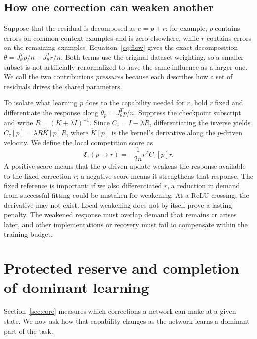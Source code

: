 \documentclass[11pt,a4paper]{article}
\begin{document}
\subsection{How one correction can weaken another}

Suppose that the residual is decomposed as $e=p+r$: for example, $p$ contains errors on common-context examples and is zero elsewhere, while $r$ contains errors on the remaining examples. Equation~\eqref{eq:flow} gives the exact decomposition $\dot\theta=J_\theta^Tp/n+J_\theta^Tr/n$. Both terms use the original dataset weighting, so a smaller subset is not artificially renormalized to have the same influence as a larger one. We call the two contributions \emph{pressures} because each describes how a set of residuals drives the shared parameters.

To isolate what learning $p$ does to the capability needed for $r$, hold $r$ fixed and differentiate the response along $\dot\theta_p=J_\theta^Tp/n$. Suppress the checkpoint subscript and write $R=(K+\lambda I)^{-1}$. Since $C_\tau=I-\lambda R$, differentiating the inverse yields $\dot C_\tau[p]=\lambda R\dot K[p]R$, where $\dot K[p]$ is the kernel's derivative along the $p$-driven velocity. We define the local competition score as
\begin{equation}
 \mathfrak C_\tau(p\!\to\!r)=-\frac{1}{2n}r^T\dot C_\tau[p]r.
 \label{eq:competition}
\end{equation}
A positive score means that the $p$-driven update weakens the response available to the fixed correction $r$; a negative score means it strengthens that response. The fixed reference is important: if we also differentiated $r$, a reduction in demand from successful fitting could be mistaken for weakening. At a ReLU crossing, the derivative may not exist. Local weakening does not by itself prove a lasting penalty. The weakened response must overlap demand that remains or arises later, and other implementations or recovery must fail to compensate within the training budget.

\section{Protected reserve and completion of dominant learning}
\label{sec:reserve}

Section~\ref{sec:core} measures which corrections a network can make at a given state. We now ask how that capability changes as the network learns a dominant part of the task.
\end{document}
